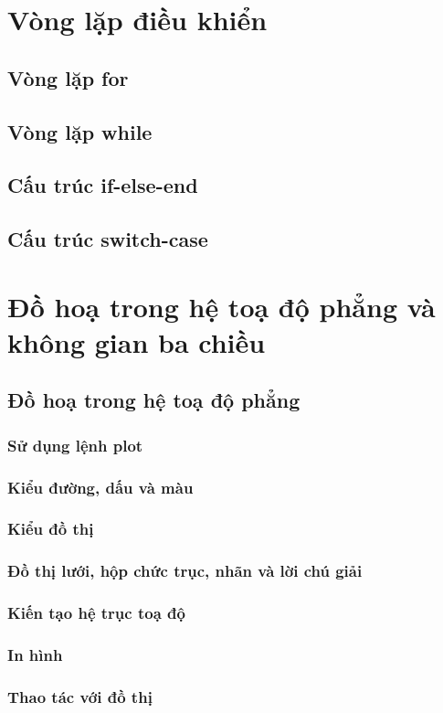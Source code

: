 \documentclass[12pt,a4paper]{article}
\begin{document}
\section{Vòng lặp điều khiển}
\subsection{Vòng lặp for}
\subsection{Vòng lặp while}
\subsection{Cấu trúc if-else-end}
\subsection{Cấu trúc switch-case}
\section{Đồ hoạ trong hệ toạ độ phẳng và không gian ba chiều}
\subsection{Đồ hoạ trong hệ toạ độ phẳng}
\subsubsection{Sử dụng lệnh plot}
\subsubsection{Kiểu đường, dấu và màu}
\subsubsection{Kiểu đồ thị}
\subsubsection{Đồ thị lưới, hộp chức trục, nhãn và lời chú giải}
\subsubsection{Kiến tạo hệ trục toạ độ}
\subsubsection{In hình}
\subsubsection{Thao tác với đồ thị}
\end{document}

